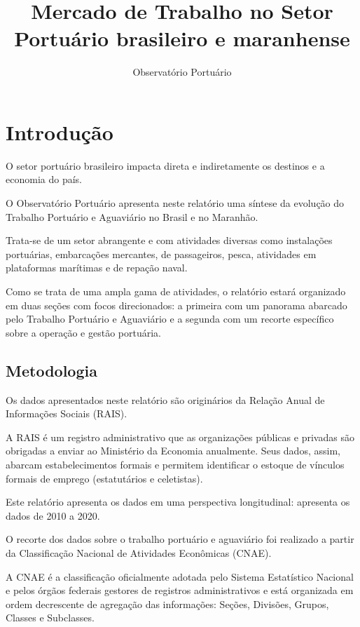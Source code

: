 \documentclass[
]{article}
\title{Mercado de Trabalho no Setor Portuário brasileiro e maranhense}
\author{Observatório Portuário}
\date{}
\begin{document}
\maketitle

{
\setcounter{tocdepth}{2}
\tableofcontents
}
\hypertarget{introduuxe7uxe3o}{%
\section{Introdução}\label{introduuxe7uxe3o}}

O setor portuário brasileiro impacta direta e indiretamente os destinos
e a economia do país.

O Observatório Portuário apresenta neste relatório uma síntese da
evolução do Trabalho Portuário e Aguaviário no Brasil e no Maranhão.

Trata-se de um setor abrangente e com atividades diversas como
instalações portuárias, embarcações mercantes, de passageiros, pesca,
atividades em plataformas marítimas e de repação naval.

Como se trata de uma ampla gama de atividades, o relatório estará
organizado em duas seções com focos direcionados: a primeira com um
panorama abarcado pelo Trabalho Portuário e Aguaviário e a segunda com
um recorte específico sobre a operação e gestão portuária.

\hypertarget{metodologia}{%
\subsection{Metodologia}\label{metodologia}}

Os dados apresentados neste relatório são originários da Relação Anual
de Informações Sociais (RAIS).

A RAIS é um registro administrativo que as organizações públicas e
privadas são obrigadas a enviar ao Ministério da Economia anualmente.
Seus dados, assim, abarcam estabelecimentos formais e permitem
identificar o estoque de vínculos formais de emprego (estatutários e
celetistas).

Este relatório apresenta os dados em uma perspectiva longitudinal:
apresenta os dados de 2010 a 2020.

O recorte dos dados sobre o trabalho portuário e aguaviário foi
realizado a partir da Classificação Nacional de Atividades Econômicas
(CNAE).

A CNAE é a classificação oficialmente adotada pelo Sistema Estatístico
Nacional e pelos órgãos federais gestores de registros administrativos e
está organizada em ordem decrescente de agregação das informações:
Seções, Divisões, Grupos, Classes e Subclasses.
\end{document}
